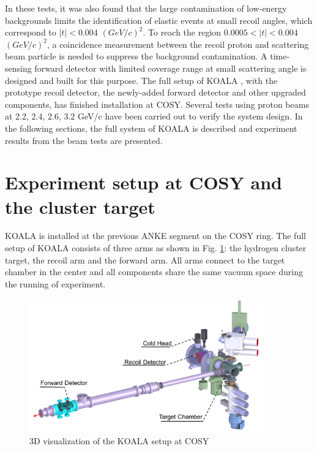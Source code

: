 \documentclass[number]{elsarticle}
\begin{document}
In these tests, it was also found that the large contamination of low-energy backgrounds limits the identification of elastic events at small recoil angles,
which correspond to \(|t| < 0.004\) \((GeV/c)^2\).
To reach the region \(0.0005 < |t| < 0.004\) \((GeV/c)^2\), a coincidence measurement between the recoil proton and scattering beam particle is needed to suppress the background contamination.
A time-sensing forward detector with limited coverage range at small scattering angle is designed and built for this purpose. 
The full setup of KOALA , with the prototype recoil detector, the newly-added forward detector and other upgraded components,  has finished installation at COSY.
Several tests using proton beams at 2.2, 2.4, 2.6, 3.2 GeV/c have been carried out to verify the system design.
In the following sections,  the full system of KOALA is described and experiment results from the beam tests are presented.

\section{Experiment setup at COSY and the cluster target}
\label{sec:setup}

KOALA is installed at the previous ANKE segment on the COSY ring.
The full setup of KOALA consists of three arms as shown in Fig. \ref{fig:setup}: the hydrogen cluster target, the recoil arm and the forward arm.
All arms connect to the target chamber in the center and all components share the same vacuum space during the running of experiment.

\begin{figure}[htbp]
\centering
\includegraphics[width=0.9\textwidth]{./koala_setup.png}
\caption{3D visualization of the KOALA setup at COSY}
\label{fig:setup}
\end{figure}
\end{document}
